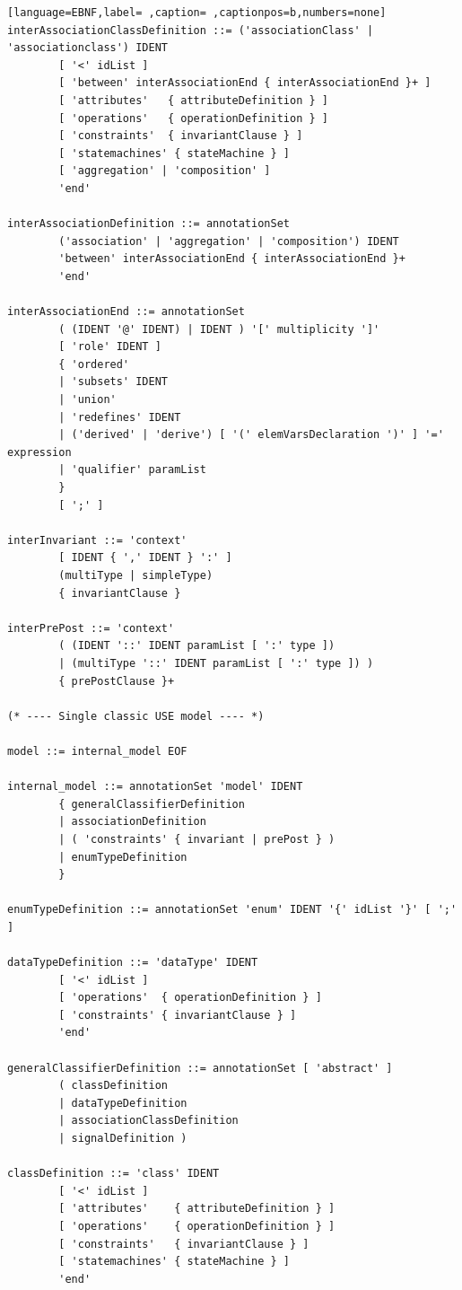 \documentclass[11pt,twoside,a4paper]{book}
\begin{document}
\begin{lstlisting}[language=EBNF,label= ,caption= ,captionpos=b,numbers=none]
interAssociationClassDefinition ::= ('associationClass' | 'associationclass') IDENT
        [ '<' idList ]
        [ 'between' interAssociationEnd { interAssociationEnd }+ ]
        [ 'attributes'   { attributeDefinition } ]
        [ 'operations'   { operationDefinition } ]
        [ 'constraints'  { invariantClause } ]
        [ 'statemachines' { stateMachine } ]
        [ 'aggregation' | 'composition' ]
        'end'

interAssociationDefinition ::= annotationSet
        ('association' | 'aggregation' | 'composition') IDENT
        'between' interAssociationEnd { interAssociationEnd }+
        'end'

interAssociationEnd ::= annotationSet
        ( (IDENT '@' IDENT) | IDENT ) '[' multiplicity ']'
        [ 'role' IDENT ]
        { 'ordered'
        | 'subsets' IDENT
        | 'union'
        | 'redefines' IDENT
        | ('derived' | 'derive') [ '(' elemVarsDeclaration ')' ] '=' expression
        | 'qualifier' paramList
        }
        [ ';' ]

interInvariant ::= 'context'
        [ IDENT { ',' IDENT } ':' ]
        (multiType | simpleType)
        { invariantClause }

interPrePost ::= 'context'
        ( (IDENT '::' IDENT paramList [ ':' type ])
        | (multiType '::' IDENT paramList [ ':' type ]) )
        { prePostClause }+

(* ---- Single classic USE model ---- *)

model ::= internal_model EOF

internal_model ::= annotationSet 'model' IDENT
        { generalClassifierDefinition
        | associationDefinition
        | ( 'constraints' { invariant | prePost } )
        | enumTypeDefinition
        }

enumTypeDefinition ::= annotationSet 'enum' IDENT '{' idList '}' [ ';' ]

dataTypeDefinition ::= 'dataType' IDENT
        [ '<' idList ]
        [ 'operations'  { operationDefinition } ]
        [ 'constraints' { invariantClause } ]
        'end'

generalClassifierDefinition ::= annotationSet [ 'abstract' ]
        ( classDefinition
        | dataTypeDefinition
        | associationClassDefinition
        | signalDefinition )

classDefinition ::= 'class' IDENT
        [ '<' idList ]
        [ 'attributes'    { attributeDefinition } ]
        [ 'operations'    { operationDefinition } ]
        [ 'constraints'   { invariantClause } ]
        [ 'statemachines' { stateMachine } ]
        'end'


\end{lstlisting}
\end{document}
